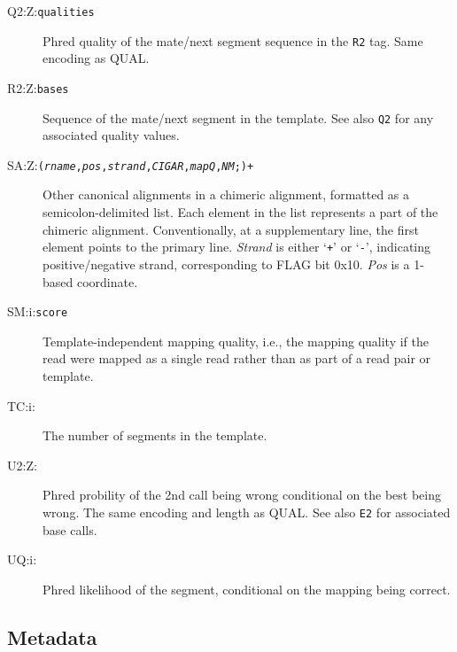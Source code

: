 \documentclass[10pt]{article}
\newcommand{\tagvalue}[1]{{\tt #1}}
\newcommand{\tagregex}[1]{{\tt #1}}
\begin{document}
\begin{description}
\item[Q2:Z:\tagvalue{qualities}]
Phred quality of the mate/next segment sequence in the {\tt R2} tag.
Same encoding as {\sf QUAL}.

\item[R2:Z:\tagvalue{bases}]
Sequence of the mate/next segment in the template.  See also {\tt Q2}
for any associated quality values.

\item[SA:Z:\tagregex{{\tt (}\emph{rname}{\tt ,}\emph{pos}{\tt ,}\emph{strand}{\tt ,}\emph{CIGAR}{\tt ,}\emph{mapQ}{\tt ,}\emph{NM}{\tt ;)}+}]
Other canonical alignments in a chimeric alignment, formatted as a semicolon-delimited list.
Each element in the list represents a part of the chimeric alignment. Conventionally, at a supplementary line, the first element points to the primary line.
\emph{Strand} is either `{\tt +}' or `{\tt -}', indicating positive/negative strand, corresponding to FLAG bit 0x10.
\emph{Pos} is a 1-based coordinate.

\item[SM:i:\tagvalue{score}]
Template-independent mapping quality, i.e., the mapping quality if the read were mapped as a single read rather than as part of a read pair or template.

\item[TC:i:\tagvalue{}]
The number of segments in the template.

\item[U2:Z:\tagvalue{}]
Phred probility of the 2nd call being wrong conditional on the best being wrong.
The same encoding and length as {\sf QUAL}.  See also {\tt E2} for associated base calls.

\item[UQ:i:\tagvalue{}]
Phred likelihood of the segment, conditional on the mapping being correct.
\end{description}

\subsection{Metadata}
\end{document}
